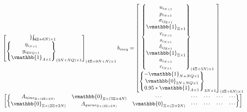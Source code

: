 \documentclass[letterpaper, 10pt, conference]{IEEEtran}
\begin{document}
\begin{equation}
\begin{array}{c}
\begin{bmatrix}
\begin{Bmatrix}
        \end{Bmatrix}_{(4\Xi + 6N) \times 1} \\
        \begin{Bmatrix}
            \eta_{i_{N \times 1}} \\
            g_{iq_{NQ \times 1}} \\
            \vmathbb{1}_{A \times 1} \\
        \end{Bmatrix}_{(3N + NQ) \times 1}
    \end{bmatrix}_{(4\Xi + 9N + N) \times 1}
    b_{ineq} =
    \begin{bmatrix}
        \begin{Bmatrix}
            u_{i_{N \times 1}} \\ p_{i_{N \times 1}} \\ \sigma_{ij_{\Xi \times 1}} \\ \vmathbb{1}_{\Xi \times 1} \\ v_{i_{N \times 1}} \\ s_{i_{N \times 1}} \\ \delta_{ij_{\Xi \times 1}} \\ \vmathbb{1}_{\Xi \times 1} \\ a_{i_{N \times 1}} \\ c_{i_{N \times 1}} \\
        \end{Bmatrix}_{(4\Xi + 3N) \times 1} \\
        \begin{Bmatrix}
            -\vmathbb{1}_{N + NQ \times 1} \\
            \vmathbb{0}_{2N + NQ \times 1} \\
            0.95*\vmathbb{1}_{A \times 1} \\
        \end{Bmatrix}_{3N \times 1}
    \end{bmatrix}_{(4\Xi + 6N) \times 1} \\
    \begin{bmatrix}
        \begin{Bmatrix}
            A_{time_{\Xi \times (2\Xi + 2N)}}   & \vmathbb{0}_{\Xi \times (3\Xi + 4N)} & \cdots                              & \cdots                       & \cdots                            & \cdots              & \cdots \\
            \vmathbb{0}_{\Xi \times (2\Xi + 2N)} & A_{queue_{\Xi \times (2\Xi + 2N)}}  & \vmathbb{0}_{\Xi \times (\Xi + 2N)}  & \cdots                       & \cdots                            & \cdots              & \cdots \\

\end{Bmatrix}
\end{bmatrix}
\end{array}
\end{equation}
\end{document}

